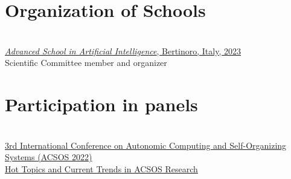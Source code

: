 \section{{\color{black}Organization of Schools}}
\halfblankline \\
\href{https://asai-er.github.io/}{\emph{Advanced School in Artificial Intelligence}, Bertinoro, Italy, 2023}
\\ Scientific Committee member and organizer \\


\section{{\color{black}Participation in panels}}
\halfblankline \\
\href{https://2022.acsos.org/details/acsos-2022-papers/36/Hot-Topics-and-Current-Trends-in-ACSOS-Research}
{3rd International Conference on Autonomic Computing and Self-Organizing Systems (ACSOS 2022)}
\\ \href{https://danysk.github.io/Slides-2022-ACSOS-Panel/#/}{Hot Topics and Current Trends in ACSOS Research} \\

